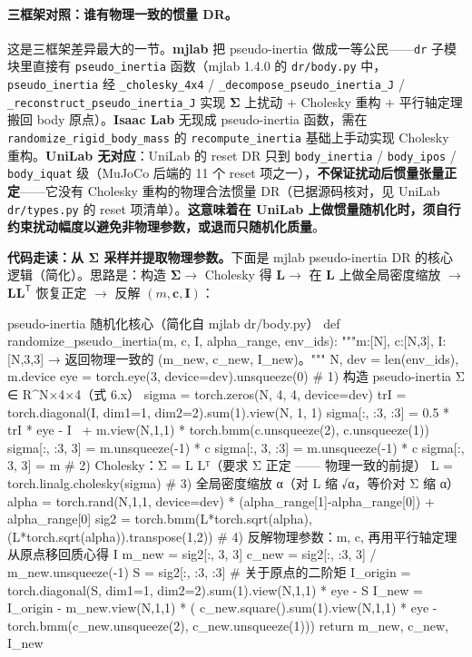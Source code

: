 \paragraph{三框架对照：谁有物理一致的惯量 DR。}这是三框架差异最大的一节。\textbf{mjlab} 把 pseudo-inertia 做成一等公民——\verb|dr| 子模块里直接有 \verb|pseudo_inertia| 函数（mjlab 1.4.0 的 \verb|dr/body.py| 中，\verb|pseudo_inertia| 经 \verb|_cholesky_4x4| / \verb|_decompose_pseudo_inertia_J| / \verb|_reconstruct_pseudo_inertia_J| 实现 $\boldsymbol\Sigma$ 上扰动 $+$ Cholesky 重构 $+$ 平行轴定理搬回 body 原点）。\textbf{Isaac Lab} 无现成 pseudo-inertia 函数，需在 \verb|randomize_rigid_body_mass| 的 \verb|recompute_inertia| 基础上手动实现 Cholesky 重构。\textbf{UniLab 无对应}：UniLab 的 reset DR 只到 \verb|body_inertia| / \verb|body_ipos| / \verb|body_iquat| 级（MuJoCo 后端的 11 个 reset 项之一），\textbf{不保证扰动后惯量张量正定}——它没有 Cholesky 重构的物理合法惯量 DR（已据源码核对，见 UniLab \verb|dr/types.py| 的 reset 项清单）。\textbf{这意味着在 UniLab 上做惯量随机化时，须自行约束扰动幅度以避免非物理参数，或退而只随机化质量}。

\textbf{代码走读：从 $\boldsymbol\Sigma$ 采样并提取物理参数。}下面是 mjlab pseudo-inertia DR 的核心逻辑（简化）。思路是：构造 $\boldsymbol\Sigma\to$ Cholesky 得 $\mathbf L\to$ 在 $\mathbf L$ 上做全局密度缩放 $\to$ $\mathbf L\mathbf L^{\mathsf T}$ 恢复正定 $\to$ 反解 $(m,\mathbf c,\mathbf I)$：

\begin{codebox}[Python]{pseudo-inertia 随机化核心（简化自 mjlab dr/body.py）}
def randomize_pseudo_inertia(m, c, I, alpha_range, env_ids):
    """m:[N], c:[N,3], I:[N,3,3] → 返回物理一致的 (m_new, c_new, I_new)。"""
    N, dev = len(env_ids), m.device
    eye = torch.eye(3, device=dev).unsqueeze(0)
    # 1) 构造 pseudo-inertia Σ ∈ R^{N×4×4}（式 6.x）
    sigma = torch.zeros(N, 4, 4, device=dev)
    trI = torch.diagonal(I, dim1=1, dim2=2).sum(1).view(N, 1, 1)
    sigma[:, :3, :3] = 0.5 * trI * eye - I \
                       + m.view(N,1,1) * torch.bmm(c.unsqueeze(2), c.unsqueeze(1))
    sigma[:, :3, 3] = m.unsqueeze(-1) * c
    sigma[:, 3, :3] = m.unsqueeze(-1) * c
    sigma[:, 3, 3]  = m
    # 2) Cholesky：Σ = L Lᵀ（要求 Σ 正定 —— 物理一致的前提）
    L = torch.linalg.cholesky(sigma)
    # 3) 全局密度缩放 α（对 L 缩 √α，等价对 Σ 缩 α）
    alpha = torch.rand(N,1,1, device=dev) * (alpha_range[1]-alpha_range[0]) + alpha_range[0]
    sig2 = torch.bmm(L*torch.sqrt(alpha), (L*torch.sqrt(alpha)).transpose(1,2))
    # 4) 反解物理参数：m, c, 再用平行轴定理从原点移回质心得 I
    m_new = sig2[:, 3, 3]
    c_new = sig2[:, :3, 3] / m_new.unsqueeze(-1)
    S = sig2[:, :3, :3]                                  # 关于原点的二阶矩
    I_origin = torch.diagonal(S, dim1=1, dim2=2).sum(1).view(N,1,1) * eye - S
    I_new = I_origin - m_new.view(N,1,1) * (
        c_new.square().sum(1).view(N,1,1) * eye
        - torch.bmm(c_new.unsqueeze(2), c_new.unsqueeze(1)))
    return m_new, c_new, I_new
\end{codebox}

